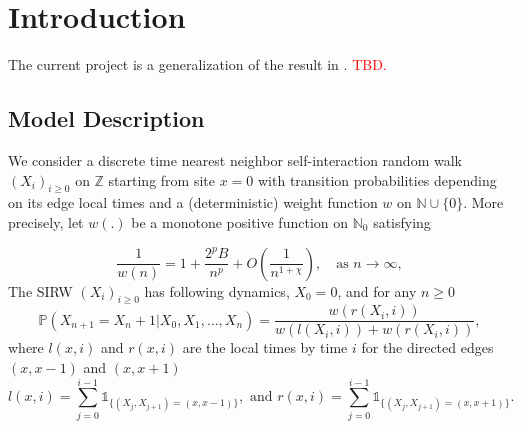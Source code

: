 \documentclass[twoside,12pt,a4paper]{article}
\numberwithin{equation}{section}
\newcommand\TBD{\textcolor{red}{TBD.}}
\begin{document}
		\maketitle

\begin{abstract}
	This document is an outline of the article for the Scaling limit of SIRW. We generalize the functional CLT in \cite{KMP22} for the asymptotically free self-interacting random walk (AF-SIRW) in the case $0<p<\frac{1}{2}$ (possibly $p=\frac{1}{2}$). The approach is to carefully approximate the local drifts of the random walk via the study of the directed edge local times, which are described by branching-like processes and generalized Ray-knight Theorems. Xiaoyu Liu and Zhe Wang are working on this project. 
	\TBD
\end{abstract}

\section{Introduction}
The current project is a generalization of the result in \cite{KMP22}. 
\TBD 


\subsection{Model Description} 
We consider a discrete time nearest neighbor self-interaction random walk $(X_i)_{i\geq 0}$ on $\mathbb{Z}$ starting from site $x=0$ with transition probabilities depending on its edge local times and a (deterministic) weight function $w$ on $\mathbb{N}\cup \{0\}$. More precisely, let $w(.)$ be a monotone positive function on $\mathbb{N}_0$ satisfying

\begin{equation}\label{eq: asymptotics of w}
	\frac{1}{w(n)} = 1+\frac{2^p B}{n^p} + O\left(\frac{1}{n^{1+\mathcal{\chi}}}\right), \quad \mbox{as $n\to \infty$}, 	
\end{equation} 
The SIRW $(X_i)_{i\geq 0}$ has following dynamics, 
$X_0 = 0$, and for any $n\geq 0$
\begin{equation}\label{dynamic}
	\mathbb{P}\left( X_{n+1} =  X_n +1 | X_0,X_1,\dots,X_n   \right) =  \frac{  w(r(X_i,i) )}{ w(l(X_i,i))  + w(r(X_i,i))   },
\end{equation}
where $l(x,i)$ and $r(x,i)$ are the local times by time $i$ for the directed edges $(x,x-1)$ and $(x,x+1)$
$$ l(x,i) = \sum_{j=0}^{i-1} \mathbb{1}_{ \{  (X_j, X_{j+1}) =  (x,x-1) \} }, \mbox{ and }  r(x,i) = \sum_{j=0}^{i-1} \mathbb{1}_{ \{  (X_j, X_{j+1}) =  (x,x+1) \} }.        $$
\end{document}
